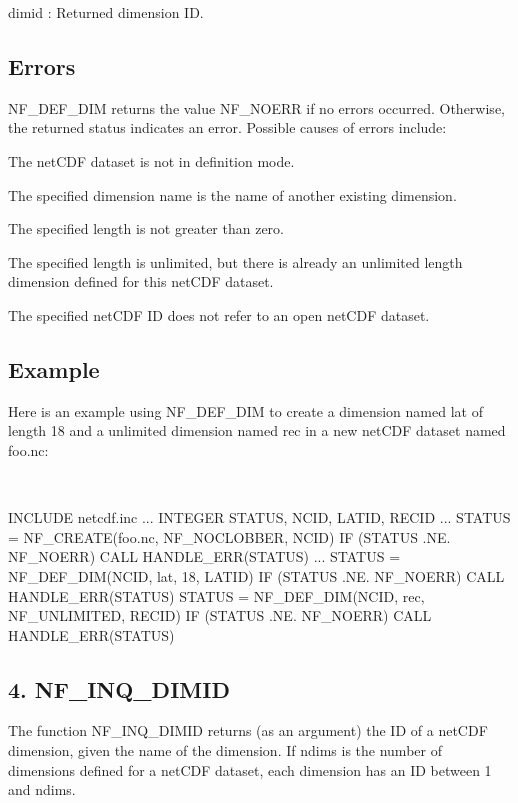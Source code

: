 {\ttfamily dimid} \+: Returned dimension ID.

\subsection*{Errors }

N\+F\+\_\+\+D\+E\+F\+\_\+\+D\+IM returns the value N\+F\+\_\+\+N\+O\+E\+RR if no errors occurred. Otherwise, the returned status indicates an error. Possible causes of errors include\+:


\begin{DoxyItemize}
\item The net\+C\+DF dataset is not in definition mode.
\item The specified dimension name is the name of another existing dimension.
\item The specified length is not greater than zero.
\item The specified length is unlimited, but there is already an unlimited length dimension defined for this net\+C\+DF dataset.
\item The specified net\+C\+DF ID does not refer to an open net\+C\+DF dataset.
\end{DoxyItemize}

\subsection*{Example }

Here is an example using N\+F\+\_\+\+D\+E\+F\+\_\+\+D\+IM to create a dimension named lat of length 18 and a unlimited dimension named rec in a new net\+C\+DF dataset named foo.\+nc\+:

 

I\+N\+C\+L\+U\+DE \textquotesingle{}netcdf.\+inc\textquotesingle{} ... I\+N\+T\+E\+G\+ER S\+T\+A\+T\+US, N\+C\+ID, L\+A\+T\+ID, R\+E\+C\+ID ... S\+T\+A\+T\+US = N\+F\+\_\+\+C\+R\+E\+A\+TE(\textquotesingle{}foo.\+nc\textquotesingle{}, N\+F\+\_\+\+N\+O\+C\+L\+O\+B\+B\+ER, N\+C\+ID) IF (S\+T\+A\+T\+US .NE. N\+F\+\_\+\+N\+O\+E\+RR) C\+A\+LL H\+A\+N\+D\+L\+E\+\_\+\+E\+R\+R(\+S\+T\+A\+T\+U\+S) ... S\+T\+A\+T\+US = N\+F\+\_\+\+D\+E\+F\+\_\+\+D\+IM(N\+C\+ID, \textquotesingle{}lat\textquotesingle{}, 18, L\+A\+T\+ID) IF (S\+T\+A\+T\+US .NE. N\+F\+\_\+\+N\+O\+E\+RR) C\+A\+LL H\+A\+N\+D\+L\+E\+\_\+\+E\+R\+R(\+S\+T\+A\+T\+U\+S) S\+T\+A\+T\+US = N\+F\+\_\+\+D\+E\+F\+\_\+\+D\+IM(N\+C\+ID, \textquotesingle{}rec\textquotesingle{}, N\+F\+\_\+\+U\+N\+L\+I\+M\+I\+T\+ED, R\+E\+C\+ID) IF (S\+T\+A\+T\+US .NE. N\+F\+\_\+\+N\+O\+E\+RR) C\+A\+LL H\+A\+N\+D\+L\+E\+\_\+\+E\+R\+R(\+S\+T\+A\+T\+U\+S)\hypertarget{nc_f77_interface_guide_f77_NF-INQ-DIMID}{}\subsection{4. N\+F\+\_\+\+I\+N\+Q\+\_\+\+D\+I\+M\+I\+D }\label{nc_f77_interface_guide_f77_NF-INQ-DIMID}
The function N\+F\+\_\+\+I\+N\+Q\+\_\+\+D\+I\+M\+ID returns (as an argument) the ID of a net\+C\+DF dimension, given the name of the dimension. If ndims is the number of dimensions defined for a net\+C\+DF dataset, each dimension has an ID between 1 and ndims.

